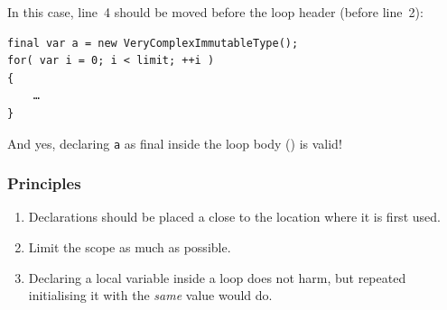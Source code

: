 In this case, line~4 should be moved before the loop header (before line~2):
\begin{lstlisting}
final var a = new VeryComplexImmutableType();
for( var i = 0; i < limit; ++i )
{
    …
}
\end{lstlisting}

And yes, declaring \lstinline|a| as final inside the loop body () is valid!

\subsubsection{Principles}
\begin{enumerate}[label=P\arabic*.]
\item{Declarations should be placed a close to the location where it is first used.}
\item{Limit the scope as much as possible.}
\item{Declaring a local variable inside a loop does not harm, but repeated initialising it with the \textit{same} value would do.}
\end{enumerate}


